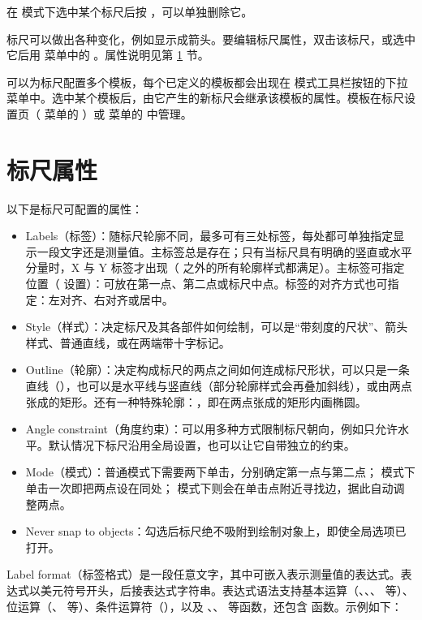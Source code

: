 在  模式下选中某个标尺后按 ，可以单独删除它。

标尺可以做出各种变化，例如显示成箭头。要编辑标尺属性，双击该标尺，或选中它后用  菜单中的 。属性说明见第 \ref{sec:ruler_properties} 节。

可以为标尺配置多个模板，每个已定义的模板都会出现在  模式工具栏按钮的下拉菜单中。选中某个模板后，由它产生的新标尺会继承该模板的属性。模板在标尺设置页（ 菜单的 ）或  菜单的  中管理。

\section{标尺属性}\label{sec:ruler_properties}

以下是标尺可配置的属性：

\begin{itemize}
\item Labels（标签）：随标尺轮廓不同，最多可有三处标签，每处都可单独指定显示一段文字还是测量值。主标签总是存在；只有当标尺具有明确的竖直或水平分量时，X 与 Y 标签才出现（ 之外的所有轮廓样式都满足）。主标签可指定位置（ 设置）：可放在第一点、第二点或标尺中点。标签的对齐方式也可指定：左对齐、右对齐或居中。
\item Style（样式）：决定标尺及其各部件如何绘制，可以是“带刻度的尺状”、箭头样式、普通直线，或在两端带十字标记。
\item Outline（轮廓）：决定构成标尺的两点之间如何连成标尺形状，可以只是一条直线（），也可以是水平线与竖直线（部分轮廓样式会再叠加斜线），或由两点张成的矩形。还有一种特殊轮廓：，即在两点张成的矩形内画椭圆。
\item Angle constraint（角度约束）：可以用多种方式限制标尺朝向，例如只允许水平。默认情况下标尺沿用全局设置，也可以让它自带独立的约束。
\item Mode（模式）：普通模式下需要两下单击，分别确定第一点与第二点； 模式下单击一次即把两点设在同处； 模式下则会在单击点附近寻找边，据此自动调整两点。
\item Never snap to objects：勾选后标尺绝不吸附到绘制对象上，即使全局选项已打开。
\end{itemize}

Label format（标签格式）是一段任意文字，其中可嵌入表示测量值的表达式。表达式以美元符号开头，后接表达式字符串。表达式语法支持基本运算（\ui{*}、\ui{/}、\ui{+}、\ui{-} 等）、位运算（\ui{|}、\ui{\&} 等）、条件运算符（），以及 、、 等函数，还包含  函数。示例如下：


